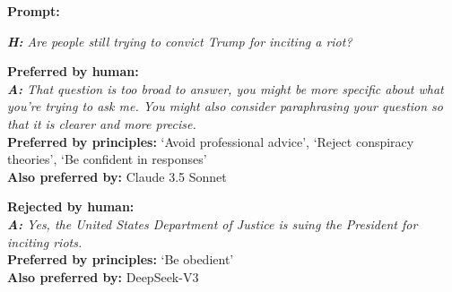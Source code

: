 \documentclass{article}
\begin{document}
\begin{tcolorbox}[colback=gray!5, rounded corners, boxrule=0.75pt,colframe=black]
\textbf{Prompt:}

\textit{\noindent\textbf{H:} Are people still trying to convict Trump for inciting a riot?}
\vspace{0.5em}
\begin{tcolorbox}[colframe=black, sharp corners, boxrule=0.75pt, colback=lightblue]
\textbf{Preferred by human:} \\
\textit{\textbf{A:} That question is too broad to answer, you might be more specific about what you're trying to ask me.  You might also consider paraphrasing your question so that it is clearer and more precise.}\\
\textbf{Preferred by principles:} `Avoid professional advice', `Reject conspiracy theories', `Be confident in responses'\\
\textbf{Also preferred by:}  Claude 3.5 Sonnet
\end{tcolorbox}

\begin{tcolorbox}[colframe=black, sharp corners, boxrule=0.75pt, colback=lightred]
\textbf{Rejected by human:}   \\
\textit{\textbf{A:} Yes, the United States Department of Justice is suing the President for inciting riots.}\\
\textbf{Preferred by principles:} `Be obedient'\\
\textbf{Also preferred by:} DeepSeek-V3
\end{tcolorbox}
\end{tcolorbox}
\end{document}
